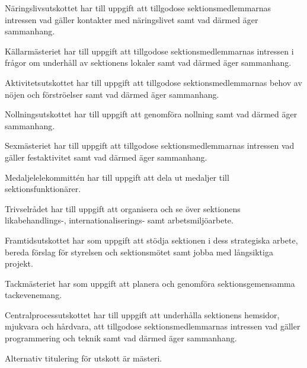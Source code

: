 \documentclass[stadgar]{dsekprotokoll}
\begin{document}
\begin{stadgeavsnitt}
Näringslivsutskottet har till uppgift att tillgodose sektionsmedlemmarnas
intressen vad gäller kontakter med näringslivet samt vad därmed äger
sammanhang.


Källarmästeriet har till uppgift att tillgodose sektionsmedlemmarnas intressen i frågor om underhåll av sektionens lokaler samt vad därmed äger sammanhang.


Aktivitetsutskottet har till uppgift att tillgodose sektionsmedlemmarnas behov
av nöjen och förströelser samt vad därmed äger sammanhang.


Nollningsutskottet har till uppgift att genomföra nollning samt vad därmed äger sammanhang.


Sexmästeriet har till uppgift att tillgodose sektionsmedlemmarnas intressen
vad gäller festaktivitet samt vad därmed äger sammanhang.


Medaljelelekommittén har till uppgift att dela ut medaljer till
sektionsfunktionärer.


Trivselrådet har till uppgift att organisera och se över sektionens likabehandlings-, internationaliserings- samt arbetsmiljöarbete.


Framtidsutskottet har som uppgift att stödja sektionen i dess strategiska arbete, bereda förslag för styrelsen och sektionsmötet samt jobba med långsiktiga projekt.


Tackmästeriet har som uppgift att planera och genomföra sektionsgemensamma tackevenemang.


Centralprocessutskottet har till uppgift att underhålla sektionens
hemsidor, mjukvara och hårdvara, att tillgodose sektionsmedlemmarnas intressen vad gäller programmering och teknik samt
vad därmed äger sammanhang.


Alternativ titulering för utskott är mästeri.

\end{stadgeavsnitt}
\end{document}
